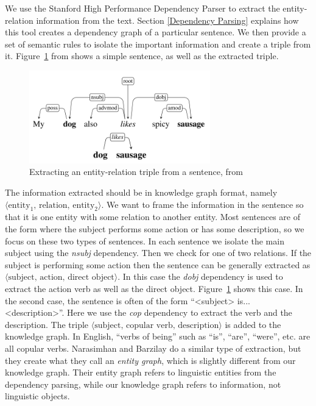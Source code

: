 \documentclass[pageno]{final_paper}
\begin{document}
We use the Stanford High Performance Dependency Parser \cite{Chen2014} to
extract the entity-relation information from the text. Section \ref{Dependency
Parsing} explains how this tool creates a dependency graph of a particular
sentence. We then provide a set of semantic rules to isolate the important
information and create a triple from it. Figure~\ref{fig: dependency extraction}
from \cite{Narasimhan2015} shows a simple sentence, as well as the extracted
triple.

\begin{figure}[!tb]
    \centering
    \includegraphics[width=0.7\textwidth,keepaspectratio]{figures/Dependency_Extraction.png}
    \caption{Extracting an entity-relation triple from a sentence, from \cite{Narasimhan2015}}
    \label{fig: dependency extraction}
\end{figure}

The information extracted should be in knowledge graph format, namely $\langle
\text{entity}_1, \,\text{relation}, \,\text{entity}_2 \rangle$. We want to frame
the information in the sentence so that it is one entity with some relation to
another entity. Most sentences are of the form where the subject performs some
action or has some description, so we focus on these two types of sentences. In
each sentence we isolate the main subject using the \textit{nsubj} dependency.
Then we check for one of two relations. If the subject is performing some action
then the sentence can be generally extracted as $\langle \text{subject},
\,\text{action}, \,\text{direct object} \rangle$. In this case the \textit{dobj}
dependency is used to extract the action verb as well as the direct object.
Figure~\ref{fig: dependency extraction} shows this case. In the second case, the
sentence is often of the form ``<subject> is... <description>''. Here we use the
\textit{cop} dependency to extract the verb and the description. The triple
$\langle \text{subject}, \,\text{copular verb}, \,\text{description} \rangle$ is
added to the knowledge graph. In English, ``verbs of being'' such as ``is'',
``are'', ``were'', etc. are all copular verbs. Narasimhan and Barzilay
\cite{Narasimhan2015} do a similar type of extraction, but they create what they
call an \textit{entity graph}, which is slightly different from our knowledge
graph. Their entity graph refers to linguistic entities from the dependency
parsing, while our knowledge graph refers to information, not linguistic
objects.
\end{document}
